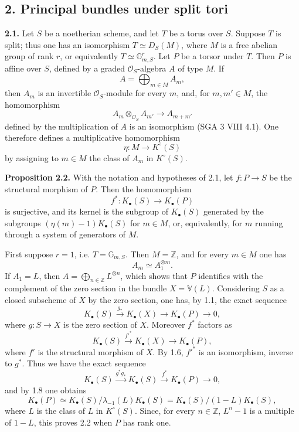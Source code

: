 \documentclass[11pt]{article}
\begin{document}
\subsection*{2. Principal bundles under split tori}

\textbf{2.1.} Let $S$ be a noetherian scheme, and let $T$ be a torus over $S$. Suppose $T$ is split; thus one has an isomorphism $T\simeq D_S(M)$, where $M$ is a free abelian group of rank $r$, or equivalently $T\simeq \mathbb G_{m,S}^r$. Let $P$ be a torsor under $T$. Then $P$ is affine over $S$, defined by a graded $\mathcal O_S$-algebra $A$ of type $M$. If
\[
 A=\bigoplus_{m\in M}A_m,
\]
then $A_m$ is an invertible $\mathcal O_S$-module for every $m$, and, for $m,m'\in M$, the homomorphism
\[
 A_m\otimes_{\mathcal O_S}A_{m'}\longrightarrow A_{m+m'}
\]
defined by the multiplication of $A$ is an isomorphism (SGA 3 VIII 4.1). One therefore defines a multiplicative homomorphism
\[
 \eta:M\longrightarrow K^\circ(S)
\]
by assigning to $m\in M$ the class of $A_m$ in $K^\circ(S)$.

\textbf{Proposition 2.2.} With the notation and hypotheses of 2.1, let $f:P\to S$ be the structural morphism of $P$. Then the homomorphism
\[
 f^*:K_\bullet(S)\longrightarrow K_\bullet(P)
\]
is surjective, and its kernel is the subgroup of $K_\bullet(S)$ generated by the subgroups $(\eta(m)-1)K_\bullet(S)$ for $m\in M$, or, equivalently, for $m$ running through a system of generators of $M$.

First suppose $r=1$, i.e. $T=\mathbb G_{m,S}$. Then $M=\mathbb Z$, and for every $m\in M$ one has
\[
 A_m\simeq A_1^{\otimes m}.
\]
If $A_1=L$, then $A=\bigoplus_{n\in\mathbb Z}L^{\otimes n}$, which shows that $P$ identifies with the complement of the zero section in the bundle $X=\mathbb V(L)$. Considering $S$ as a closed subscheme of $X$ by the zero section, one has, by 1.1, the exact sequence
\[
 K_\bullet(S)\xrightarrow{g_*}K_\bullet(X)\longrightarrow K_\bullet(P)\longrightarrow 0,
\]
where $g:S\to X$ is the zero section of $X$. Moreover $f^*$ factors as
\[
 K_\bullet(S)\xrightarrow{f'^*}K_\bullet(X)\longrightarrow K_\bullet(P),
\]
where $f'$ is the structural morphism of $X$. By 1.6, $f'^*$ is an isomorphism, inverse to $g^*$. Thus we have the exact sequence
\[
 K_\bullet(S)\xrightarrow{g^*g_*}K_\bullet(S)\xrightarrow{f^*}K_\bullet(P)\longrightarrow 0,
\]
and by 1.8 one obtains
\[
 K_\bullet(P)\simeq K_\bullet(S)/\lambda_{-1}(L)K_\bullet(S)=K_\bullet(S)/(1-L)K_\bullet(S),
\]
where $L$ is the class of $L$ in $K^\circ(S)$. Since, for every $n\in\mathbb Z$, $L^n-1$ is a multiple of $1-L$, this proves 2.2 when $P$ has rank one.
\end{document}
